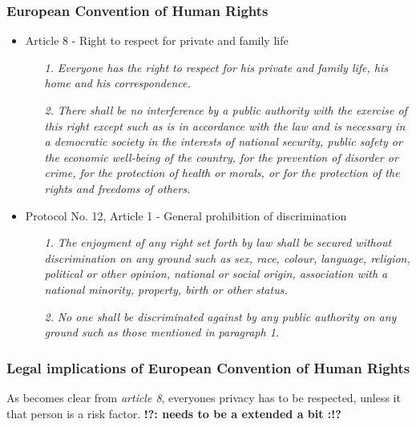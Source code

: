 \documentclass[11pt]{article}
\newcommand{\tocheck}[1]{{\bf !?: #1 :!?}}
\begin{document}
\subsubsection{European Convention of Human Rights}
\begin{itemize}
	\item Article 8 - Right to respect for private and family life
		\begin{itemize}
			\item [\textit{1.}] {\it Everyone has the right to respect for his private and family life, his home and his correspondence.}
			\item [\textit{2.}] {\it There shall be no interference by a public authority with the exercise of this right except such as is in accordance with the law and is necessary in a democratic society in the interests of national security, public safety or the economic well-being of the country, for the prevention of disorder or crime, for the protection of health or morals, or for the protection of the rights and freedoms of others.}
		\end{itemize}
	\item Protocol No. 12, Article 1 - General prohibition of discrimination 
		\begin{itemize}
			\item [\textit{1.}] {\it The enjoyment of any right set forth by law shall be secured without discrimination on any ground such as sex, race, colour, language, religion, political or other opinion, national or social origin, association with a national minority, property, birth or other status.}
			\item [\textit{2.}] {\it No one shall be discriminated against by any public authority on any ground such as those mentioned in paragraph 1.}
		\end{itemize}
\end{itemize}


\subsubsection{Legal implications of European Convention of Human Rights}
As becomes clear from \textit{article 8}, everyones privacy has to be respected, unless it that person is a risk factor. \tocheck{needs to be a extended a bit}
\end{document}
